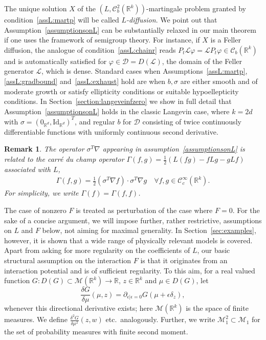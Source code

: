 \documentclass{article}
\newtheorem{remark}[theorem]{Remark}
\newcommand{\R}{\mathbb{R}}
\newcommand{\F}{F}
\newcommand{\C}{\mathcal C}
\newcommand{\cM}{\mathcal M}
\begin{document}
The unique solution $X$ of the $(L,\C_b^2(\R^k))$-martingale problem granted by condition~\ref{assL:martp}
will be called \emph{$L$-diffusion}. We point out that Assumption~\ref{assumptionsonL} can be substantially
relaxed in our main theorem if one uses the framework of semigroup theory. For instance, if $X$ is a Feller
diffusion, the analogue of condition~\ref{assL:chainr} reads
$P_t\mathcal L\varphi =\mathcal LP_t\varphi \in \C_b(\R^k)$
and is automatically satisfied for $\varphi \in \mathcal D =D(\mathcal L )$, the domain of the Feller
generator $\mathcal L$, which is dense. Standard cases when Assumptions~\ref{assL:martp}, \ref{assL:gradbound}
and~\ref{assL:exhaust} hold are when $b,\sigma$ are either smooth and of moderate growth or satisfy
ellipticity conditions or suitable hypoellepticity conditions. In Section~\ref{section:langeveinfzero} we show
in full detail that Assumption~\ref{assumptionsonL} holds in the classic Langevin case, where $k=2d$ with
$\sigma = (0_{\R^d},\mbox{Id}_{\R^d})^T$, and regular $b$ for $\mathcal D$ consisting of twice continuously
differentiable functions with uniformly continuous second derivative.

\begin{remark}
  \label{rem-carre}
  The operator $\sigma^T\nabla$ appearing in assumption~\ref{assumptionsonL} is related to the \emph{carr\'e
    du champ} operator $\Gamma(f,g) = \frac{1}{2}\left( L(fg) - fLg -gLf \right) $ associated with $L$,
  \begin{align*}
    \Gamma(f,g) = \frac 1 2 (\sigma^T \nabla f) \cdot \sigma^T \nabla g \quad \forall f,g \in \C_c^\infty(\R^k).
  \end{align*}
  For simplicity, we write $\Gamma(f) = \Gamma(f,f)$.
\end{remark}

\smallskip

The case of nonzero $\F$ is treated as perturbation of the case where $\F=0$. For the sake of a concise
argument, we will impose further, rather restrictive, assumptions on $L$ and $\F$ below, not aiming for
maximal generality. In Section~\ref{sec:examples}, however, it is shown that a wide range of physically
relevant models is covered. Apart from asking for more regularity on the coefficients of $L$, our basic
structural assumption on the interaction $\F$ is that it originates from an interaction potential and is of
sufficient regularity. To this aim, for a real valued function
$G\colon D(G) \subset \mathcal{M}(\R^k) \to \R$, $z \in \R^k$ and $\mu \in D(G)$, let
\begin{equation*}
  \frac{\delta G}{\delta \mu}(\mu, z) =  \partial_{\epsilon|\epsilon=0} G(\mu+\epsilon\delta_z),
\end{equation*} 
whenever this directional derivative exists; here $\mathcal M(\R^k)$ is the space of finite measures.  We
define $\frac{\delta^2 G}{\delta \mu^2}(z,w)$ etc.\ analogously.  Further, we write $\cM^2_1 \subset \cM_1$
for the set of probability measures with finite second moment.
\end{document}
